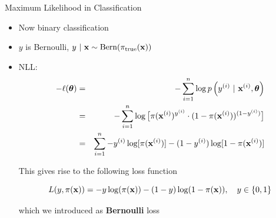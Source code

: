 \documentclass[11pt,compress,t,notes=noshow, xcolor=table]{beamer}
\begin{document}
\begin{vbframe}{Maximum Likelihood in Classification}


\begin{itemize}

\item Now binary classification
\item $y$ is Bernoulli, $y ~|~ \mathbf{x} \sim \text{Bern}(\pi_\text{true}(\mathbf{x}))$
\item  NLL:
\begin{eqnarray*}
- \ell(\bm{\theta}) &=& -\sum\limits_{i=1}^n \log p\left(y^{(i)} ~|~\mathbf{x}^{(i)}, \bm{\theta}\right) \\ 
&=& - \sum\limits_{i=1}^n \log \big[\pi(\mathbf{x}^{(i)})^{y^{(i)}} \cdot (1 - \pi(\mathbf{x}^{(i)}))^{(1 - y^{(i)})} \big]\\
&=& \sum\limits_{i=1}^n -y^{(i)} \log[\pi(\mathbf{x}^{(i)})] - (1-y^{(i)}) \log [1 - \pi(\mathbf{x}^{(i)})]
\end{eqnarray*}



This gives rise to the following loss function 

$$
  L(y, \pi(\mathbf{x})) = -y\log(\pi(\mathbf{x}))-(1-y)\log(1-\pi(\mathbf{x})), \quad y \in \{0, 1\}
$$

which we introduced as \textbf{Bernoulli} loss 


\end{itemize}

\end{vbframe}
\end{document}

